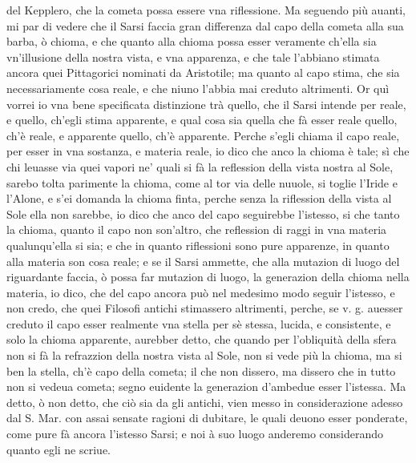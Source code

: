 \documentclass[11pt,twoside,openany]{book}
\begin{document}
del Kepplero, che la cometa possa essere vna riflessione. Ma seguendo più auanti, mi par di vedere che il Sarsi faccia gran differenza dal capo della cometa alla sua barba, ò chioma, e che quanto alla chioma possa esser veramente ch'ella sia vn'illusione della nostra vista, e vna apparenza, e che tale l'abbiano stimata ancora quei Pittagorici nominati da Aristotile; ma quanto al capo stima, che sia necessariamente cosa reale, e che niuno l'abbia mai creduto altrimenti. Or quì vorrei io vna bene specificata distinzione trà quello, che il Sarsi intende per reale, e quello, ch'egli stima apparente, e qual cosa sia quella che fà esser reale quello, ch'è reale, e apparente quello, ch'è apparente. Perche s'egli chiama il capo reale, per esser in vna sostanza, e materia reale, io dico che anco la chioma è tale; sì che chi leuasse via quei vapori ne' quali si fà la reflession della vista nostra al Sole, sarebo tolta parimente la chioma, come al tor via delle nuuole, si toglie l'Iride e l'Alone, e s'ei domanda la chioma finta, perche senza la riflession della vista al Sole ella non sarebbe, io dico che anco del capo seguirebbe l'istesso, si che tanto la chioma, quanto il capo non son'altro, che reflession di raggi in vna materia qualunqu'ella si sia; e che in quanto riflessioni sono pure apparenze, in quanto alla materia son cosa reale; e se il Sarsi ammette, che alla mutazion di luogo del riguardante faccia, ò possa far mutazion di luogo, la generazion della chioma nella materia, io dico, che del capo ancora può nel medesimo modo seguir l'istesso, e non credo, che quei Filosofi antichi stimassero altrimenti, perche, se v. g. auesser creduto il capo esser realmente vna stella per sè stessa, lucida, e consistente, e solo la chioma apparente, aurebber detto, che quando per l'obliquità della sfera non si fà la refrazzion della nostra vista al Sole, non si vede più la chioma, ma si ben la stella, ch'è capo della cometa; il che non dissero, ma dissero che in tutto non si vedeua cometa; segno euidente la generazion d'ambedue esser l'istessa. Ma detto, ò non detto, che ciò sia da gli antichi, vien messo in considerazione adesso dal S. Mar. con assai sensate ragioni di dubitare, le quali deuono esser ponderate, come pure fà ancora l'istesso Sarsi; e noi à suo luogo anderemo considerando quanto egli ne scriue.
\end{document}
